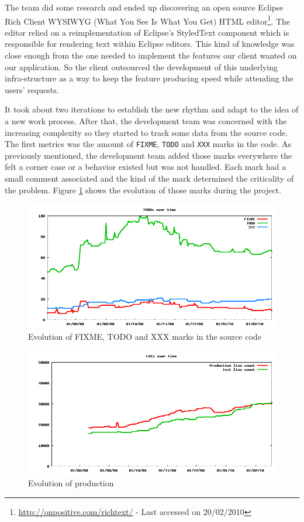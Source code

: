 \documentclass[lnbip]{svmultln}
\begin{document}
The team did some research and ended up discovering an open source
Eclipse Rich Client WYSIWYG (What You See Is What You Get) HTML
editor\footnote{\url{http://onpositive.com/richtext/} - Last accessed
  on 20/02/2010}. The editor relied on a reimplementation of Eclipse's
StyledText component which is responsible for rendering text within
Eclipse editors. This kind of knowledge was close enough from the one
needed to implement the features our client wanted on our
application. So the client outsourced the development of this
underlying infra-structure as a way to keep the feature producing
speed while attending the users' requests.

It took about two iterations to establish the new rhythm and adapt to
the idea of a new work process. After that, the development team was
concerned with the increasing complexity so they started to track some
data from the source code. The first metrics was the amount of
\texttt{FIXME}, \texttt{TODO} and \texttt{XXX} marks in the code. As
previously mentioned, the development team added those marks
everywhere the felt a corner case or a behavior existed but was not
handled. Each mark had a small comment associated and the kind of the
mark determined the criticality of the problem. Figure \ref{fig:TODOs}
shows the evolution of those marks during the project.

\begin{figure}[hbt]
  \centerline{
    \includegraphics[width=120mm]{TODOs.png}
  }
  \caption{Evolution of FIXME, TODO and XXX marks in the source code}
  \label{fig:TODOs}
\end{figure}

\begin{figure}[hbt]
  \centerline{
    \includegraphics[width=120mm]{LOCs.png}
  }
  \caption{Evolution of production }
  \label{fig:LOCs}
\end{figure}
\end{document}
